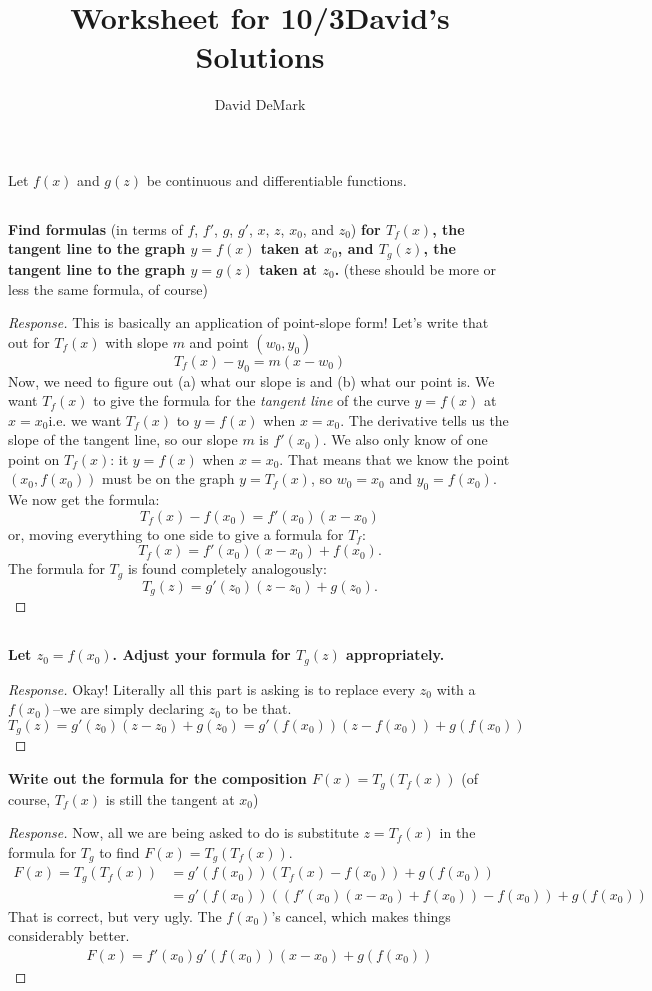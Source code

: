 \documentclass[english]{article}
\title{Worksheet for 10/3\textemdash David's Solutions}
\author{David DeMark}
\date{\due}
\newcommand{\prob}[1]{\setcounter{section}{#1-1}\section{}}
\newcommand{\prt}[1]{\setcounter{subsection}{#1-1}\subsection{}}
\theoremstyle{remark}
\theoremstyle{definition}
\begin{document}
	\maketitle

\prob{1} Let $f(x)$ and $g(z)$ be continuous and differentiable functions. \prt{1} 
\textbf{Find formulas} (in terms of $f$, $f'$, $g$, $g'$, $x$, $z$, $x_0$, and $z_0$) \textbf{for $T_f(x)$, the tangent line to the graph $y=f(x)$ taken at $x_0$, and $T_g(z)$, the tangent line to the graph $y=g(z)$ taken at $z_0$.} (these should be more or less the same formula, of course\textellipsis)\\
\begin{proof}[Response]
This is basically an application of point-slope form! Let's write that out for $T_f(x)$ with slope $m$ and point $(w_0,y_0)$\textellipsis 
$$T_f(x)-y_0=m(x-w_0)$$
Now, we need to figure out (a) what our slope is and (b) what our point is. We want $T_f(x)$ to give the formula for the \emph{tangent line} of the curve $y=f(x)$ at $x=x_0$\textemdash i.e. we want $T_f(x)$ to  $y=f(x)$ when $x=x_0$. The derivative tells us the slope of the tangent line, so our slope $m$ is $f'(x_0)$. We also only know of one point on $T_f(x)$: it  $y=f(x)$ when $x=x_0$. That means that we know the point $(x_0,f(x_0))$ must be on the graph $y=T_f(x)$, so $w_0=x_0$ and $y_0=f(x_0)$. We now get the formula:
$$T_f(x)-f(x_0)=f'(x_0)(x-x_0)$$
or, moving everything to one side to give a formula for $T_f$:
$$T_f(x)=f'(x_0)(x-x_0)+f(x_0).$$
The formula for $T_g$ is found completely analogously:
$$T_g(z)=g'(z_0)(z-z_0)+g(z_0).$$
\end{proof} 
\prt{2}\textbf{Let $z_0=f(x_0)$. Adjust your formula for $T_g(z)$ appropriately.}
\begin{proof}[Response]
	Okay! Literally all this part is asking is to replace every $z_0$ with a $f(x_0)$--we are simply declaring $z_0$ to be that.
	$$T_g(z)=g'(z_0)(z-z_0)+g(z_0)=g'(f(x_0))\left(z-f(x_0)\right)+g(f(x_0))$$
\end{proof}
\noindent\textbf{ Write out the formula for the composition $F(x)=T_g(T_f(x))$} (of course, $T_f(x)$ is still the tangent at $x_0$)
\begin{proof}[Response]
	Now, all we are being asked to do is substitute $z=T_f(x)$ in the formula for $T_g$ to find $F(x)=T_g(T_f(x))$.
	\begin{align*}
	F(x)=	T_g(T_f(x))&=g'(f(x_0))\left(T_f(x)-f(x_0)\right)+g(f(x_0))\\
		&=g'(f(x_0))\left(\left(f'(x_0)(x-x_0)+f(x_0)\right)-f(x_0)\right)+g(f(x_0))
	\end{align*}
	That is correct, but very ugly. The $f(x_0)$'s cancel, which makes things considerably better.
	\begin{align*}
	F(x)=f'(x_0)g'(f(x_0))(x-x_0)+g(f(x_0))
	\end{align*}
	\end{proof}
\end{document}
